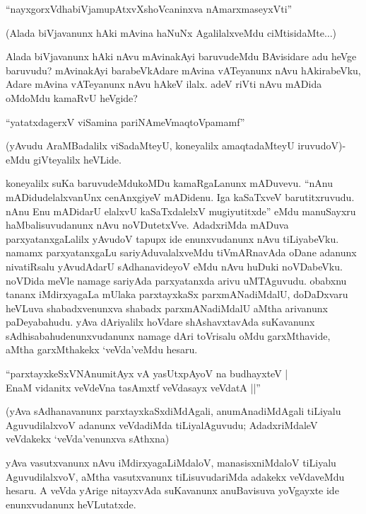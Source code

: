 \begin{shloka}
``nayxgorxVdhabiVjamupAtxvXshoVcaninxva nAmarxmaseyxVti''
\end{shloka}

(Alada biVjavanunx hAki mAvina haNuNx AgalilalxveMdu ciMtisidaMte$\ldots$)

Alada biVjavanunx hAki nAvu mAvinakAyi baruvudeMdu BAvisidare adu heVge baruvudu? mAvinakAyi barabeVkAdare mAvina vATeyanunx nAvu hAkirabeVku, Adare mAvina vATeyanunx nAvu hAkeV ilalx. adeV riVti nAvu mADida oMdoMdu kamaRvU heVgide?

\begin{shloka}
``yatatxdagerxV viSamina pariNAmeV\s maqtoVpamamf''
\end{shloka}

(yAvudu AraMBadalilx viSadaMteyU, koneyalilx amaqtadaMteyU iruvudoV)-eMdu giVteyalilx heVLide.

koneyalilx suKa baruvudeMdukoMDu kamaRgaLanunx mADuvevu. ``nAnu mADidudelalxvanUnx cenAnxgiyeV mADidenu. Iga kaSaTxveV barutitxruvudu. nAnu Enu mADidarU elalxvU kaSaTxdalelxV mugiyutitxde'' eMdu manuSayxru haMbalisuvudanunx nAvu noVDutetxVve. AdadxriMda mADuva parxyatanxgaLalilx yAvudoV tapupx ide enunxvudanunx nAvu tiLiyabeVku. namamx parxyatanxgaLu sariyAduvalalxveMdu tiVmARnavAda oDane adanunx nivatiRsalu yAvudAdarU sAdhanavideyoV eMdu nAvu huDuki noVDabeVku. noVDida meVle namage sariyAda parxyatanxda arivu uMTAguvudu. obabxnu tananx iMdirxyagaLa mUlaka parxtayxkaSx parxmANadiMdalU, doDaDxvaru heVLuva shabadxvenunxva shabadx parxmANadiMdalU aMtha arivanunx paDeyabahudu. yAva dAriyalilx hoVdare shAshavxtavAda suKavanunx sAdhisabahudenunxvudanunx namage dAri toVrisalu oMdu garxMthavide, aMtha garxMthakekx `veVda'veMdu hesaru.

\begin{shloka}
``parxtayxkeSxVNAnumitAyx vA yasUtxpAyoV na budhayxteV |\\
EnaM vidanitx veVdeVna tasAmxtf veVdasayx veVdatA ||''
\end{shloka}

(yAva sAdhanavanunx parxtayxkaSxdiMdAgali, anumAnadiMdAgali tiLiyalu AguvudilalxvoV adanunx veVdadiMda tiLiyalAguvudu; AdadxriMdaleV veVdakekx `veVda'venunxva sAthxna)

yAva vasutxvanunx nAvu iMdirxyagaLiMdaloV, manasisxniMdaloV tiLiyalu AguvudilalxvoV, aMtha vasutxvanunx tiLisuvudariMda adakekx veVdaveMdu hesaru. A veVda yArige nitayxvAda suKavanunx anuBavisuva yoVgayxte ide enunxvudanunx heVLutatxde.


